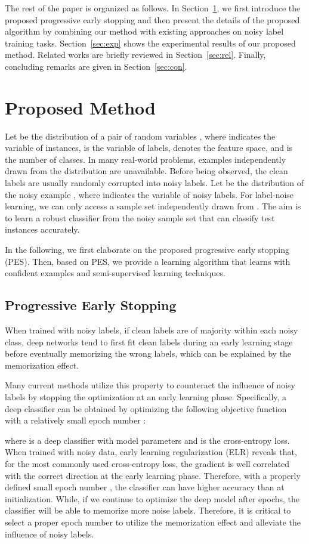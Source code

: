 \documentclass[11pt]{article}
\begin{document}
The rest of the paper is organized as follows. In Section~\ref{sec:3}, we first introduce the proposed progressive early stopping and then present the details of the proposed algorithm by combining our method with existing approaches on noisy label training tasks. Section~\ref{sec:exp} shows the experimental results of our proposed method.  Related works are
briefly reviewed in Section~\ref{sec:rel}. Finally, concluding remarks are given in Section~\ref{sec:con}.



\section{Proposed Method}
\label{sec:3}
Let  be the distribution of a pair of random variables , where  indicates the variable of instances,  is the variable of labels,  denotes the feature space, and  is the number of classes. In many real-world problems, examples independently drawn from the distribution  are unavailable. Before being observed, the clean labels are usually randomly corrupted into noisy labels. Let  be the distribution of the noisy example , where  indicates the variable of noisy labels. For label-noise learning, we can only access a sample set  independently drawn from . The aim is to learn a robust classifier from the noisy sample set that can classify test instances accurately. 

In the following, we first elaborate on the proposed progressive early stopping (PES). Then, based on PES, we provide a learning algorithm that learns with confident examples and semi-supervised learning techniques.

\subsection{Progressive Early Stopping}
When trained with noisy labels, if clean labels are of majority within each noisy class, deep networks tend to first fit clean labels during an early learning stage before eventually memorizing the wrong labels, which can be explained by the memorization effect.

Many current methods utilize this property to counteract the influence of noisy labels by stopping the optimization at an early learning phase. Specifically, a deep classifier can be obtained by optimizing the following objective function with a relatively small epoch number :

where  is a deep classifier with model parameters  and  is the cross-entropy loss. When trained with noisy data, early learning regularization (ELR) \cite{Liu2020ELR} reveals that, for the most commonly used cross-entropy loss,  the gradient is well correlated with the correct direction at the early learning phase. Therefore, with a properly defined small epoch number , the classifier can have higher accuracy than at initialization. While, if we continue to optimize the deep model after  epochs, the classifier will be able to memorize more noise labels. Therefore, it is critical to select a proper epoch number  to utilize the memorization effect and alleviate the influence of noisy labels.
\end{document}
